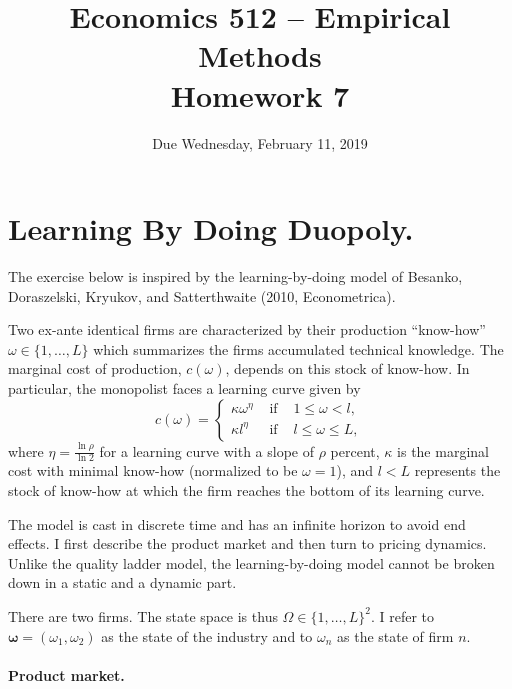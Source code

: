 \documentclass[11pt]{article}
\begin{document}
\onehalfspace

\title{Economics 512 -- Empirical Methods \\ Homework 7}
\author{Due Wednesday, February 11, 2019}
\date{}
\maketitle

\section*{Learning By Doing Duopoly.}

The exercise below is inspired by the learning-by-doing model of Besanko,
Doraszelski, Kryukov, and Satterthwaite (2010, Econometrica).

Two ex-ante identical firms are characterized by their production ``know-how'' $\omega
\in \{1,\ldots,L\}$ which summarizes the firms accumulated technical knowledge. 
The marginal cost of production, $c(\omega)$,
depends on this stock of know-how. In particular, the monopolist
faces a learning curve given by
\begin{equation*}
c(\omega )=\left\{
\begin{array}{ccc}
\kappa \omega ^{\eta } & \mbox{ if } & 1\leq \omega <l, \\
\kappa l^{\eta } & \mbox{ if } & l\leq \omega \leq L,%
\end{array}
\right.
\end{equation*}
where $\eta =\frac{\ln \rho }{\ln 2}$ for a learning curve with a
slope of $\rho $ percent, $\kappa $ is the marginal cost with
minimal know-how (normalized to be $\omega =1$), and $l<L$
represents the stock of know-how at which the firm reaches the
bottom of its learning curve.

The model is cast in discrete time and has an infinite horizon to
avoid end effects. I first describe the product market and then turn
to pricing dynamics. Unlike the quality ladder model, the
learning-by-doing model cannot be broken down in a static and a
dynamic part.

There are two firms.  The state space is thus
$\Omega \in \{1,\ldots,L\}^2$. I refer to $\mathbf{\omega}=(\omega_1,\omega_2)$ 
as the state of the industry and to $\omega_n$ as the state of firm $n$.

\paragraph{Product market.}
\end{document}
